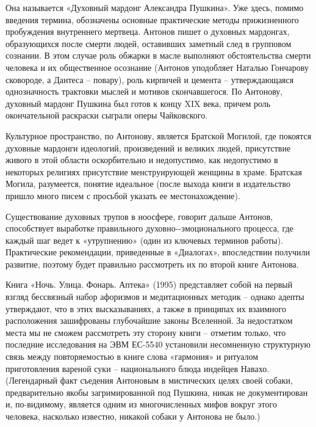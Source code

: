 \begin{pairs}
\begin{Leftside}
{\pstart
Она называется «Духовный мардонг Але\-ксандра Пушкина». Уже здесь, помимо введения термина, обозначены основные \linebreak практические методы прижизненного пробуждения внутреннего мертвеца. Антонов пишет о духовных мардонгах, образующи\-хся после смерти людей, оставивших заметный след в групповом сознании. В этом случае роль обжарки в масле выполняют обстоятельства смерти человека и их общественное осознание (Антонов уподобляет Наталью Гончарову сковороде, а Дантеса -- повару), роль кирпичей и цемента -- утверждающаяся однозначность трактов\-ки мыслей и мотивов скончавшегося. По Антонову, духовный мардонг Пушкина \linebreak был готов к концу XIX века, причем роль окончательной раскраски сыграли оперы Чайковского.
\pend

\pstart
Культурное пространство, по Антонову, является Братской Могилой, где покоятся духовные мардонги идеологий, произведений и великих людей, присутствие живого в этой области оскорбительно и недопустимо, как недопустимо в некоторых \linebreak религиях присутствие менструирующей \linebreak женщины в храме. Братская Могила, разумеется, понятие идеальное (после выхода \linebreak книги в издательство пришло много писем с просьбой указать ее местонахождение).
\pend

\pstart
Существование духовных трупов в ноосфере, говорит дальше Антонов, способствует выработке правильного духовно-\linebreak-эмоционального процесса, где каждый \linebreak шаг ведет к «утрупнению» (один из ключевых терминов работы). Практические рекомендации, приведенные в «Диалогах», впоследствии получили развитие, поэтому будет правильно рассмотреть их по второй книге Антонова.
\pend

\pstart
Книга «Ночь. Улица. Фонарь. Аптека» \linebreak (1995) представляет собой на первый взг\-ляд бессвязный набор афоризмов и медитационных методик -- однако адепты ут\-верждают, что в этих высказываниях, а \linebreak также в принципах их взаимного расположения зашифрованы глубочайшие законы Вселенной. За недостатком места мы не сможем рассмотреть эту сторону книги -- отметим только, что последние исследования на ЭВМ ЕС-5540 установили несомненную структурную связь между повторяемостью в книге слова «гармония» и ритуалом приготовления вареной суки -- национального блюда индейцев Навахо. (Легендарный факт съедения Антоновым \linebreak в мистических целях своей собаки, предварительно якобы загримированной под Пушкина, никак не документирован и, по-видимому, является одним из многочисленных мифов вокруг этого человека, насколько известно, никакой собаки у Антонова не было.)
\pend

}
\end{Leftside}
\end{pairs}
